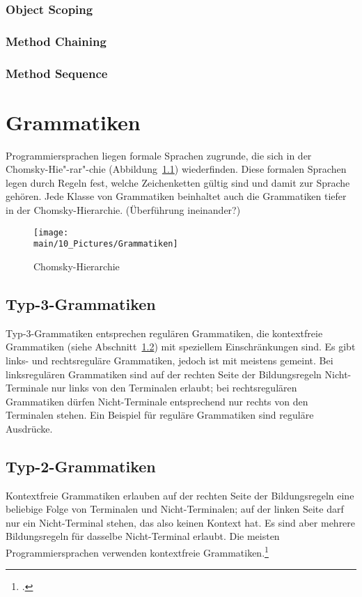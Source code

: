\documentclass[../InterneDSLs.tex]{subfiles}
\begin{document}
\subsection{Object Scoping}
\subsection{Method Chaining}
\subsection{Method Sequence}


\chapter{Grammatiken}
Programmiersprachen liegen formale Sprachen zugrunde, die sich in der Chomsky-Hie"-rar"-chie (Abbildung~\ref{fig:chomkskyhierarchie}) wiederfinden. Diese formalen Sprachen legen durch Regeln fest, welche Zeichenketten gültig sind und damit zur Sprache gehören. Jede Klasse von Grammatiken beinhaltet auch die Grammatiken tiefer in der Chomsky-Hierarchie. (Überführung ineinander?)

\begin{figure}
\centering
\texttt{[image: \\main/10\_Pictures/Grammatiken]}
\caption{Chomsky-Hierarchie}
\label{fig:chomkskyhierarchie}
\end{figure}

\section{Typ-3-Grammatiken}\label{sec:refulaeregrammatik}
Typ-3-Grammatiken entsprechen regulären Grammatiken, die kontextfreie Grammatiken (siehe Abschnitt~\ref{sec:kontextfreiegrammatik}) mit speziellem Einschränkungen sind. Es gibt links- und rechtsreguläre Grammatiken, jedoch ist mit  meistens  gemeint. Bei linksregulären Grammatiken sind auf der rechten Seite der Bildungsregeln Nicht-Terminale nur links von den Terminalen erlaubt; bei rechtsregulären Grammatiken dürfen Nicht-Terminale entsprechend nur rechts von den Terminalen stehen. Ein Beispiel für reguläre Grammatiken sind reguläre Ausdrücke.

\section{Typ-2-Grammatiken}\label{sec:kontextfreiegrammatik}
Kontextfreie Grammatiken erlauben auf der rechten Seite der Bildungsregeln eine beliebige Folge von Terminalen und Nicht-Terminalen; auf der linken Seite darf nur ein Nicht-Terminal stehen, das also keinen Kontext hat. Es sind aber mehrere Bildungsregeln für dasselbe Nicht-Terminal erlaubt. Die meisten Programmiersprachen verwenden kontextfreie Grammatiken.\footcite{Fowler.2010}
\end{document}
